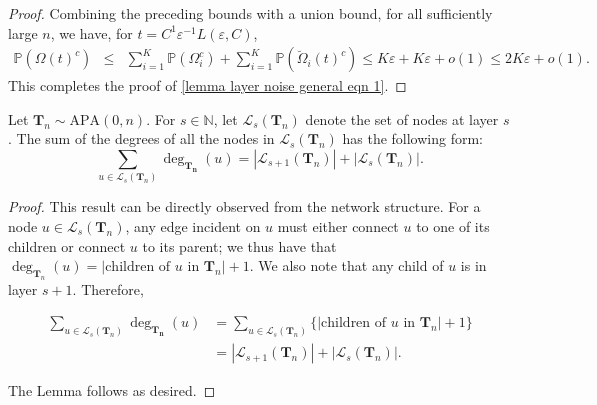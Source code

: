 \documentclass[twoside,11pt]{article}
\theoremstyle{remark}
\begin{document}
\begin{proof}
Combining the preceding bounds with a union bound, for all sufficiently large $n$, we have, for $t = C^1\varepsilon^{-1} L\left(\varepsilon, C\right)$,
%
\begin{eqnarray*}
\mathbb{P}\left({\Omega}\left(t\right)^c\right)
&\le & \sum_{i=1}^K \mathbb{P}\left({\Omega}^c_i\right)+\sum_{i=1}^K \mathbb{P}\left(\breve{\Omega}_i(t)^c \right)\le K\varepsilon+K\varepsilon+o\left(1\right)\le 2K \varepsilon + o(1).
\end{eqnarray*}
%
This completes the proof of \eqref{lemma layer noise general  eqn 1}.    
\end{proof}



\begin{lemma}
\label{lemma degree sum}
Let $\boldsymbol{T}_n \sim \mathrm{APA}(0, n)$. For $s\in \mathbb{N}$, let $\mathcal{L}_s(\boldsymbol{T}_n)$ denote the set of nodes at layer $s$. The sum of the degrees of all the nodes in $\mathcal{L}_s(\boldsymbol{T}_n)$ has the following form:
%
\begin{equation*}
\sum_{u\in \mathcal{L}_s\left(\boldsymbol{T}_{n}\right)}\operatorname{deg}_{\boldsymbol{T_n}}\left(u\right)=\left|\mathcal{L}_{s+1}\left(\boldsymbol{T}_{n}\right)\right|+\left|\mathcal{L}_{s}\left(\boldsymbol{T}_{n}\right)\right|.
\end{equation*}
%
\end{lemma}
\begin{proof}
This result can be directly observed from the network structure. For a node $u \in \mathcal{L}_s(\bm{T}_n)$, any edge incident on $u$ must either connect $u$ to one of its children or connect $u$ to its parent; we thus have that $\operatorname{deg}_{\bm{T}_n}(u) = | \text{children of $u$ in $\bm{T}_n$}| + 1$. We also note that any child of $u$ is in layer $s+1$. Therefore, 

\begin{align*}
\sum_{u\in \mathcal{L}_s\left(\boldsymbol{T}_{n}\right)} \operatorname{deg}_{\boldsymbol{T_n}}\left(u\right) &= 
\sum_{u\in \mathcal{L}_s\left(\boldsymbol{T}_{n}\right)}
 \bigl\{ | \text{children of $u$ in $\bm{T}_n$} | + 1 \bigr\} \\
 &= |\mathcal{L}_{s+1}(\bm{T}_n) | + | \mathcal{L}_s(\bm{T}_n)|.
\end{align*}

The Lemma follows as desired.

\end{proof}
\end{document}

